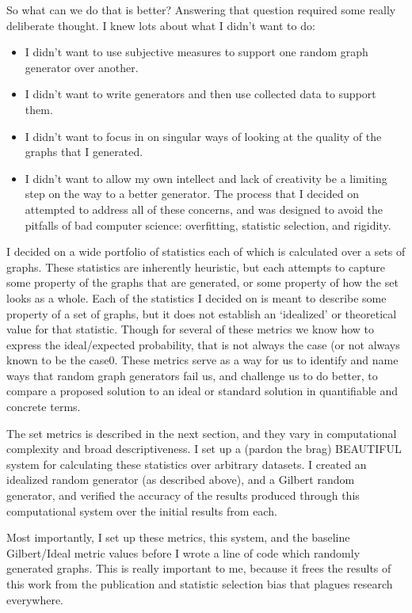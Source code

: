 So what can we do that is better?
Answering that question required some really deliberate thought.
I knew lots about what I didn't want to do:
\begin{itemize}
\item{I didn't want to use subjective measures to support one random graph generator over another.}
\item{I didn't want to write generators and then use collected data to support them.}
\item{I didn't want to focus in on singular ways of looking at the quality of the graphs that I generated.}
\item{I didn't want to allow my own intellect and lack of creativity be a limiting step on the way to a better generator.}
The process that I decided on attempted to address all of these concerns, and was designed to avoid the pitfalls of bad computer science: overfitting, statistic selection, and rigidity.
\end{itemize}

I decided on a wide portfolio of statistics each of which is calculated over a sets of graphs.
These statistics are inherently heuristic, but each attempts to capture some property of the graphs that are generated, or some property of how the set looks as a whole.
Each of the statistics I decided on is meant to describe some property of a set of graphs, but it does not establish an `idealized' or theoretical value for that statistic.
Though for several of these metrics we know how to express the ideal/expected probability, that is not always the case (or not always known to be the case0.
These metrics serve as a way for us to identify and name ways that random graph generators fail us, and challenge us to do better, to compare a proposed solution to an ideal or standard solution in quantifiable and concrete terms.

The set metrics is described in the next section, and they vary in computational complexity and broad descriptiveness.
I set up a (pardon the brag) BEAUTIFUL system for calculating these statistics over arbitrary datasets.
I created an idealized random generator (as described above), and a Gilbert random generator, and verified the accuracy of the results produced through this computational system over the initial results from each.

Most importantly, I set up these metrics, this system, and the baseline Gilbert/Ideal metric values before I wrote a line of code which randomly generated graphs.
This is really important to me, because it frees the results of this work from the publication and statistic selection bias that plagues research everywhere.

